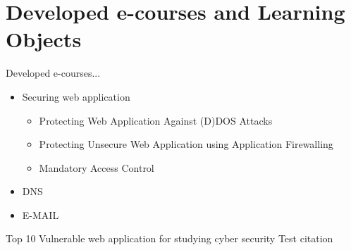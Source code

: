 \section{Developed e-courses and Learning Objects}
\label{Developed e-courses and Learning Objects}
Developed e-courses...
\begin{itemize}
	\item Securing web application
		\begin{itemize}
			\item Protecting Web Application Against (D)DOS Attacks
			\item Protecting Unsecure Web Application using Application Firewalling
			\item Mandatory Access Control
		\end{itemize}
	\item DNS
	\item E-MAIL
\end{itemize}

Top 10 Vulnerable web application for studying cyber security  \cite{url:pulse}
Test citation \cite{10VulnerApps} \cite{greenwade93}
